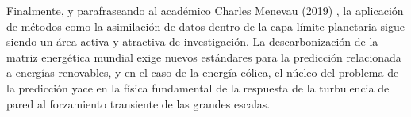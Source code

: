 Finalmente, y parafraseando al académico Charles Menevau (2019) \cite{doi:10.1080/14685248.2019.1584664}, la aplicación de métodos como la asimilación de datos dentro de la capa límite planetaria sigue siendo un área activa y atractiva de investigación. La descarbonización de la matriz energética mundial exige nuevos estándares para la predicción relacionada a energías renovables, y en el caso de la energía eólica, el núcleo del problema de la predicción yace en la física fundamental de la respuesta de la turbulencia de pared al forzamiento transiente de las grandes escalas.

